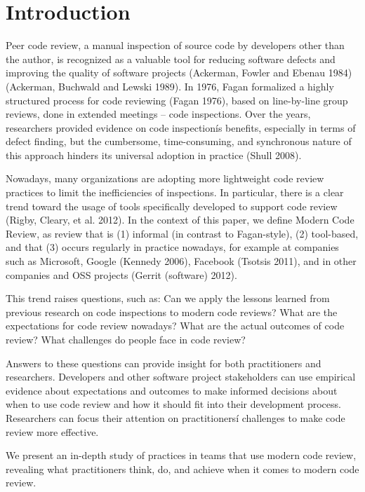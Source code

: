 
\section{Introduction} \label{sec:introduction}


Peer code review, a manual inspection of source code by developers other than
the author, is recognized as a valuable tool for reducing software defects and
improving the quality of software projects (Ackerman, Fowler and Ebenau 1984)
(Ackerman, Buchwald and Lewski 1989). In 1976, Fagan formalized a highly
structured process for code reviewing (Fagan 1976), based on line-by-line group
reviews, done in extended meetings -- code inspections. Over the years,
researchers provided evidence on code inspectionís benefits, especially in
terms of defect finding, but the cumbersome, time-consuming, and synchronous
nature of this approach hinders its universal adoption in practice (Shull
2008).

Nowadays, many organizations are adopting more lightweight code review
practices to limit the inefficiencies of inspections. In particular, there is a
clear trend toward the usage of tools specifically developed to support code
review (Rigby, Cleary, et al. 2012). In the context of this paper, we define
Modern Code Review, as review that is (1) informal (in contrast to
Fagan-style), (2) tool-based, and that (3) occurs regularly in practice
nowadays, for example at companies such as Microsoft, Google (Kennedy 2006),
Facebook (Tsotsis 2011), and in other companies and OSS projects (Gerrit
(software) 2012).

This trend raises questions, such as: Can we apply the lessons learned from
previous research on code inspections to modern code reviews? What are the
expectations for code review nowadays? What are the actual outcomes of code
review? What challenges do people face in code review?

Answers to these questions can provide insight for both practitioners and
researchers.  Developers and other software project stakeholders can use
empirical evidence about expectations and outcomes to make informed decisions
about when to use code review and how it should fit into their development
process. Researchers can focus their attention on practitionersí challenges to
make code review more effective.

We present an in-depth study of practices in teams that use modern code review,
revealing what practitioners think, do, and achieve when it comes to modern
code review.

